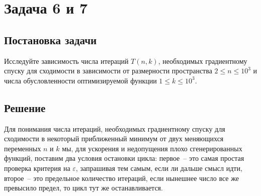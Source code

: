 \documentclass[12pt, a4paper, oneside, final]{article}
\begin{document}
	\section*{Задача 6 и 7}
	\subsection*{Постановка задачи}
	Исследуйте зависимость числа итераций $T(n, k)$, необходимых градиентному спуску для сходимости в зависимости от размерности пространства $2 \leqslant n \leqslant 10^{3}$ и числа обусловленности оптимизируемой функции $1 \leqslant k \leqslant 10^{3}$. 
	\subsection*{Решение}
	Для понимания числа итераций, необходимых градиентному спуску для сходимости в некоторый приближенный минимум от двух меняющихся переменных $n$ и $k$ мы, для ускорения и недопущения плохо сгенерированных функций, поставим два условия остановки цикла: первое~-- это самая простая проверка критерия на $\varepsilon$, запрашивая тем самым, если ли дальше смысл идти, второе~-- это предельное количество итераций, если нынешнее число все же превысило предел, то цикл тут же останавливается.
\end{document}
